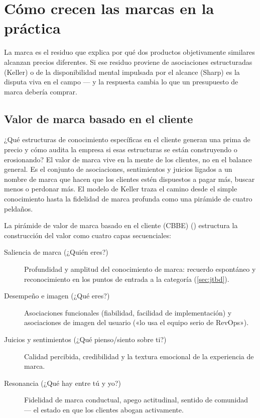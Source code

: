 \chapter{Cómo crecen las marcas en la práctica}\label{ch:brand-growth}


La marca es el residuo que explica por qué dos productos objetivamente similares alcanzan precios diferentes. Si ese residuo proviene de asociaciones estructuradas (Keller) o de la disponibilidad mental impulsada por el alcance (Sharp) es la disputa viva en el campo --- y la respuesta cambia lo que un presupuesto de marca debería comprar.

\section{Valor de marca basado en el cliente}\label{sec:cbbe}

¿Qué estructuras de conocimiento específicas en el cliente generan una prima de precio y cómo audita la empresa si esas estructuras se están construyendo o erosionando? El valor de marca vive en la mente de los clientes, no en el balance general. Es el conjunto de asociaciones, sentimientos y juicios ligados a un nombre de marca que hacen que los clientes estén dispuestos a pagar más, buscar menos o perdonar más. El modelo de Keller traza el camino desde el simple conocimiento hasta la fidelidad de marca profunda como una pirámide de cuatro peldaños.

La pirámide de valor de marca basado en el cliente (CBBE) (\textcite{keller1993customer}) estructura la construcción del valor como cuatro capas secuenciales:

\begin{description}
  \item[Saliencia de marca (¿Quién eres?)] Profundidad y amplitud del conocimiento de marca: recuerdo espontáneo y reconocimiento en los puntos de entrada a la categoría (\cref{sec:jtbd}).
  \item[Desempeño e imagen (¿Qué eres?)] Asociaciones funcionales (fiabilidad, facilidad de implementación) y asociaciones de imagen del usuario («lo usa el equipo serio de RevOps»).
  \item[Juicios y sentimientos (¿Qué pienso/siento sobre ti?)] Calidad percibida, credibilidad y la textura emocional de la experiencia de marca.
  \item[Resonancia (¿Qué hay entre tú y yo?)] Fidelidad de marca conductual, apego actitudinal, sentido de comunidad --- el estado en que los clientes abogan activamente.
\end{description}

